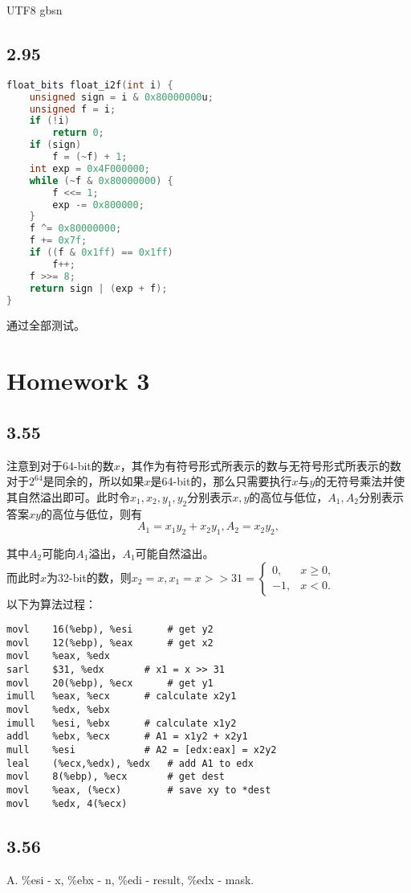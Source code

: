 \documentclass {article}
\begin{document}
\begin {CJK*} {UTF8} {gbsn}
	  \subsection{2.95}
	    \begin{lstlisting}[language=C]
float_bits float_i2f(int i) {
	unsigned sign = i & 0x80000000u;
	unsigned f = i;
	if (!i)
		return 0;
	if (sign)
		f = (~f) + 1;
	int exp = 0x4F000000;
	while (~f & 0x80000000) {
		f <<= 1;
		exp -= 0x800000;
	}
	f ^= 0x80000000;
	f += 0x7f;
	if ((f & 0x1ff) == 0x1ff)
		f++;
	f >>= 8;
	return sign | (exp + f);
}
	    \end{lstlisting}
		通过全部测试。\\

  \section{Homework 3}
    \subsection{3.55}
	  注意到对于64-bit的数$x$，其作为有符号形式所表示的数与无符号形式所表示的数对于$2^{64}$是同余的，所以如果$x$是64-bit的，那么只需要执行$x$与$y$的无符号乘法并使其自然溢出即可。此时令$x_1,x_2,y_1,y_2$分别表示$x,y$的高位与低位，$A_1,A_2$分别表示答案$xy$的高位与低位，则有
	  $$A_1=x_1y_2+x_2y_1,A_2=x_2y_2,$$

	  其中$A_2$可能向$A_1$溢出，$A_1$可能自然溢出。\\

	  而此时$x$为32-bit的数，则$x_2=x,x_1=x>>31=\begin{cases}
		  0, & x\geq 0,\\
		  -1, & x<0.
	  \end{cases}$\\

	  以下为算法过程：
	\begin{lstlisting}[language={[x86masm]Assembler}]
movl	16(%ebp), %esi		# get y2
movl	12(%ebp), %eax		# get x2
movl	%eax, %edx
sarl	$31, %edx		# x1 = x >> 31
movl	20(%ebp), %ecx		# get y1
imull	%eax, %ecx		# calculate x2y1
movl	%edx, %ebx
imull	%esi, %ebx		# calculate x1y2
addl	%ebx, %ecx		# A1 = x1y2 + x2y1
mull	%esi			# A2 = [edx:eax] = x2y2
leal	(%ecx,%edx), %edx	# add A1 to edx
movl	8(%ebp), %ecx		# get dest
movl	%eax, (%ecx)		# save xy to *dest
movl	%edx, 4(%ecx)
	  \end{lstlisting}

    \subsection{3.56}
	  A. \%esi - x, \%ebx - n, \%edi - result, \%edx - mask.\\


\end{CJK*}
\end{document}
